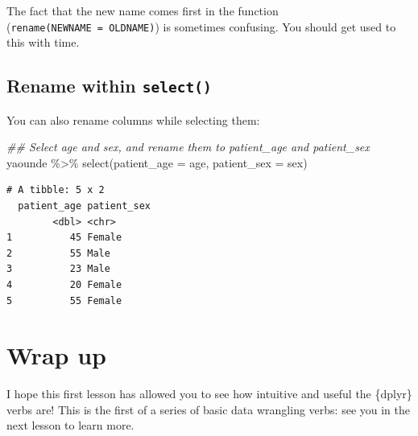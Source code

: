 \documentclass[
  letterpaper,
  DIV=11,
  numbers=noendperiod]{scrreprt}
\newenvironment{Shaded}{\begin{snugshade}}{\end{snugshade}}
\newcommand{\AttributeTok}[1]{\textcolor[rgb]{0.40,0.45,0.13}{#1}}
\newcommand{\DocumentationTok}[1]{\textcolor[rgb]{0.37,0.37,0.37}{\textit{#1}}}
\newcommand{\FunctionTok}[1]{\textcolor[rgb]{0.28,0.35,0.67}{#1}}
\newcommand{\NormalTok}[1]{\textcolor[rgb]{0.00,0.23,0.31}{#1}}
\newcommand{\SpecialCharTok}[1]{\textcolor[rgb]{0.37,0.37,0.37}{#1}}
\begin{document}
\begin{tcolorbox}[enhanced jigsaw, titlerule=0mm, colback=white, left=2mm, breakable, opacitybacktitle=0.6, colbacktitle=quarto-callout-caution-color!10!white, colframe=quarto-callout-caution-color-frame, bottomtitle=1mm, opacityback=0, coltitle=black, arc=.35mm, toptitle=1mm, title=\textcolor{quarto-callout-caution-color}{\faFire}\hspace{0.5em}{Watch Out}, leftrule=.75mm, toprule=.15mm, bottomrule=.15mm, rightrule=.15mm]

The fact that the new name comes first in the function
(\texttt{rename(NEWNAME\ =\ OLDNAME)}) is sometimes confusing. You
should get used to this with time.

\end{tcolorbox}

\subsection{\texorpdfstring{Rename within
\texttt{select()}}{Rename within select()}}\label{rename-within-select}

You can also rename columns while selecting them:

\begin{Shaded}
\begin{Highlighting}[]
\DocumentationTok{\#\# Select \textasciigrave{}age\textasciigrave{} and \textasciigrave{}sex\textasciigrave{}, and rename them to \textasciigrave{}patient\_age\textasciigrave{} and \textasciigrave{}patient\_sex\textasciigrave{}}
\NormalTok{yaounde }\SpecialCharTok{\%\textgreater{}\%} 
  \FunctionTok{select}\NormalTok{(}\AttributeTok{patient\_age =}\NormalTok{ age, }
         \AttributeTok{patient\_sex =}\NormalTok{ sex)}
\end{Highlighting}
\end{Shaded}

\begin{verbatim}
# A tibble: 5 x 2
  patient_age patient_sex
        <dbl> <chr>      
1          45 Female     
2          55 Male       
3          23 Male       
4          20 Female     
5          55 Female     
\end{verbatim}

\section{Wrap up}\label{wrap-up-2}

I hope this first lesson has allowed you to see how intuitive and useful
the \{dplyr\} verbs are! This is the first of a series of basic data
wrangling verbs: see you in the next lesson to learn more.
\end{document}
